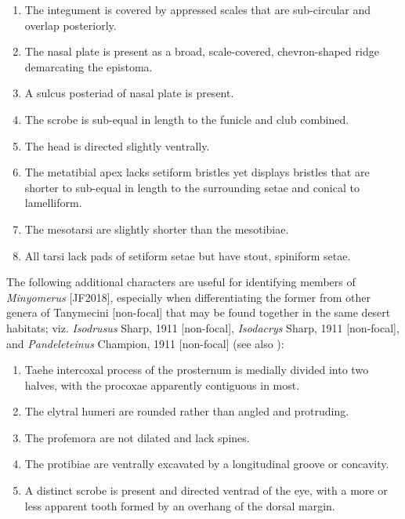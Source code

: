 \documentclass[fleqn,10pt,lineno]{wlpeerj} %
\begin{document}
	\begin{enumerate}[itemsep=-0.4em]
		\item The integument is covered by appressed scales that are sub-circular and overlap posteriorly.
		\item The nasal plate is present as a broad, scale-covered, chevron-shaped ridge demarcating the epistoma.
		\item A sulcus posteriad of nasal plate is present.
		\item The scrobe is sub-equal in length to the funicle and club combined.
		\item The head is directed slightly ventrally.
		\item The metatibial apex lacks setiform bristles yet displays bristles that are shorter to sub-equal in length to the surrounding setae and conical to lamelliform.
		\item The mesotarsi are slightly shorter than the mesotibiae.
		\item All tarsi lack pads of setiform setae but have stout, spiniform setae.
	\end{enumerate}
	
	The following additional characters are useful for identifying members of \textit{Minyomerus} [JF2018], especially when differentiating the former from other genera of Tanymecini [non-focal] that may be found together in the same desert habitats; viz. \textit{Isodrusus} Sharp, 1911 [non-focal], \textit{Isodacrys} Sharp, 1911 [non-focal], and \textit{Pandeleteinus} Champion, 1911 [non-focal] (see also \citealt{anderson2002}):
	
	\begin{enumerate} [itemsep=-0.4em]
		\item Taehe intercoxal process of the prosternum is medially divided into two halves, with the procoxae apparently contiguous in most.
		\item The elytral humeri are rounded rather than angled and protruding.
		\item The profemora are not dilated and lack spines.
		\item The protibiae are ventrally excavated by a longitudinal groove or concavity.
		\item A distinct scrobe is present and directed ventrad of the eye, with a more or less apparent tooth formed by an overhang of the dorsal margin.
	\end{enumerate}
	
\end{document}
